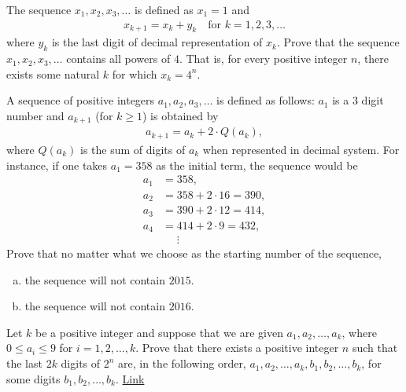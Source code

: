 \begin{problem}
	The sequence $x_1, x_2, x_3, \ldots$ is defined as $x_1 = 1$ and
	\begin{align*}
	x_{k+1} = x_k + y_k \quad \text{for } k=1, 2, 3, \ldots
	\end{align*}
	where $y_k$ is the last digit of decimal representation of $x_k$. Prove that the sequence $x_1, x_2, x_3, \dots$ contains all powers of $4$. That is, for every positive integer $n$, there exists some natural $k$ for which $x_k=4^n$.
\end{problem}



\begin{problem}
	A sequence of positive integers $a_1, a_2, a_3, \dots$ is defined as follows: $a_1$ is a $3$ digit number and $a_{k+1}$ (for $k \geq 1$) is obtained by
	\begin{align*}
	a_{k+1} = a_k + 2 \cdot Q(a_k),
	\end{align*}
	where $Q(a_k)$ is the sum of digits of $a_k$ when represented in decimal system. For instance, if one takes $a_1 = 358$ as the initial term, the sequence would be
	\begin{align*}
	a_1 &= 358,\\
	a_2 &= 358 + 2 \cdot 16 = 390,\\
	a_3 &= 390+ 2 \cdot 12 = 414,\\
	a_4 &= 414 + 2 \cdot 9 = 432,\\
	&\phantom{=}\vdots
	\end{align*}
	Prove that no matter what we choose as the starting number of the sequence,
	\begin{enumerate}[(a)]
		\item the sequence will not contain $2015$.
		\item the sequence will not contain $2016$.		
	\end{enumerate}
\end{problem}



\begin{problem}[IberoAmerican]
	Let $k$ be a positive integer and suppose that we are given $a_1, a_2,\dots, a_k$, where $0 \leq a_i \leq 9$ for $i=1,2,\ldots,k$. Prove that there exists a positive integer $n$ such that the last $2k$ digits of $2^n$ are, in the following order, $a_1, a_2,\dots, a_k , b_1, b_2, \dots, b_k$, for some digits $b_1, b_2, \dots, b_k$. \hfill \href{http://artofproblemsolving.com/community/c6h1312214p7032871}{Link}
\end{problem}


